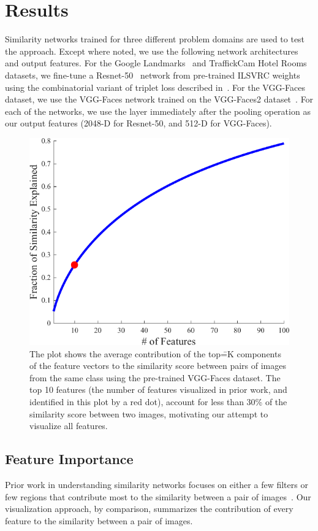 \section{Results}
Similarity networks trained for three different problem domains are used to test the approach. Except where noted, we use the following network architectures and output features. For the Google Landmarks~\cite{googleLandmarks} and TraffickCam Hotel Rooms~\cite{aipr2015} datasets, we fine-tune a Resnet-50~\cite{resnet} network from pre-trained ILSVRC weights~\cite{ILSVRC15} using the combinatorial variant of triplet loss described in~\cite{HermansBeyer2017Arxiv}. For the VGG-Faces dataset, we use the VGG-Faces network trained on the VGG-Faces2 dataset~\cite{vggfaces,vggface2}. For each of the networks, we use the layer immediately after the pooling operation as our output features (2048-D for Resnet-50, and 512-D for VGG-Faces).

\begin{figure}
    \centering
    \includegraphics[width=0.5\columnwidth]{figures/chapter7/contribByFeature.png}
    \caption{The plot shows the average contribution of the top\==K components of the feature vectors to the similarity score between pairs of images from the same class using the pre-trained VGG-Faces dataset. The top 10 features (the number of features visualized in prior work, and identified in this plot by a red dot), account for less than 30\% of the similarity score between two images, motivating our attempt to visualize all features.}
    \label{fig:contribByFeature}
\end{figure}

\subsection{Feature Importance}
\label{sec:FeatureImportance}
Prior work in understanding similarity networks focuses on either a few filters or few regions that contribute most to the similarity between a pair of images~\cite{Ahmed_2015_CVPR,RTC16,tolias2016rmac}. Our visualization approach, by comparison, summarizes the contribution of every feature to the similarity between a pair of images. 

